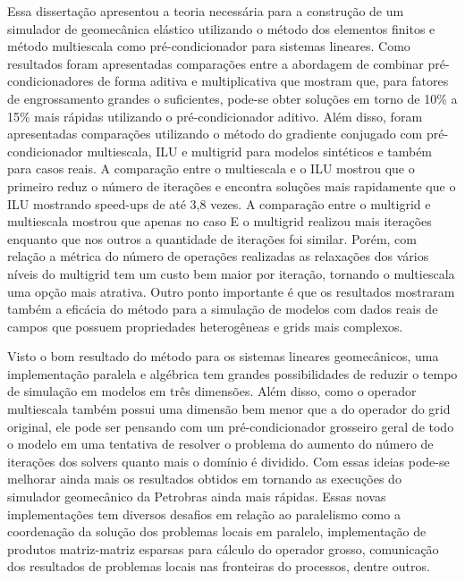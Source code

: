 
Essa dissertação apresentou a teoria necessária para a construção de um simulador de geomecânica elástico utilizando o método dos elementos finitos e método multiescala como pré-condicionador para sistemas lineares. Como resultados foram apresentadas comparações entre a abordagem de combinar pré-condicionadores de forma aditiva e multiplicativa que mostram que, para fatores de engrossamento grandes o suficientes, pode-se obter soluções em torno de 10\% a 15\%  mais rápidas utilizando o pré-condicionador aditivo. Além disso, foram apresentadas comparações utilizando o método do gradiente conjugado com pré-condicionador  multiescala, ILU e multigrid para modelos sintéticos e também para casos reais. A comparação entre o multiescala e o ILU mostrou que o primeiro reduz o número de iterações e encontra soluções mais rapidamente que o ILU mostrando speed-ups de até 3,8 vezes. A comparação entre o multigrid e multiescala mostrou que apenas no caso E o multigrid realizou mais iterações enquanto que nos outros a quantidade de iterações foi similar. Porém, com relação a métrica do número de operações realizadas as relaxações dos vários níveis do multigrid  tem um custo bem maior por iteração, tornando o multiescala uma opção mais atrativa.  Outro ponto importante é que os resultados mostraram também a eficácia do método para a simulação de modelos com dados reais de campos que possuem propriedades heterogêneas e grids mais complexos. 

Visto o bom resultado do método para os sistemas lineares geomecânicos, uma implementação paralela e algébrica tem grandes possibilidades de reduzir o tempo de simulação em modelos em três dimensões. Além disso, como o operador multiescala também possui uma dimensão bem menor que a do operador do grid original, ele pode ser pensando com um pré-condicionador grosseiro geral de todo o modelo em uma tentativa de resolver o problema do aumento do número de iterações dos solvers quanto mais o domínio é dividido. Com essas ideias pode-se melhorar ainda mais os resultados obtidos em \citet{geomecrio} tornando as execuções do simulador geomecânico da Petrobras ainda mais rápidas. Essas novas implementações tem diversos desafios em relação ao paralelismo como a coordenação da solução dos problemas locais em paralelo, implementação de produtos matriz-matriz esparsas para  cálculo do operador grosso, comunicação dos resultados de problemas locais nas fronteiras do processos, dentre outros.



